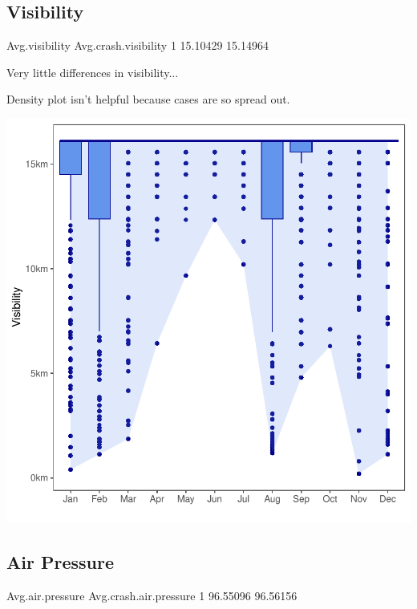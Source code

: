 \documentclass[11pt, a4paper]{article}
\begin{document}
\pagebreak
\subsection{Visibility}

\begin{Schunk}
\begin{Soutput}
  Avg.visibility Avg.crash.visibility
1       15.10429             15.14964
\end{Soutput}
\begin{Soutput}
Very little differences in visibility...
\end{Soutput}
\begin{Soutput}
Density plot isn't helpful because cases are so spread out.
\end{Soutput}
\end{Schunk}

\includegraphics{variableinvestigation-018}



\pagebreak
\subsection{Air Pressure}

\begin{Schunk}
\begin{Soutput}
  Avg.air.pressure Avg.crash.air.pressure
1         96.55096               96.56156
\end{Soutput}
\end{Schunk}
\end{document}
